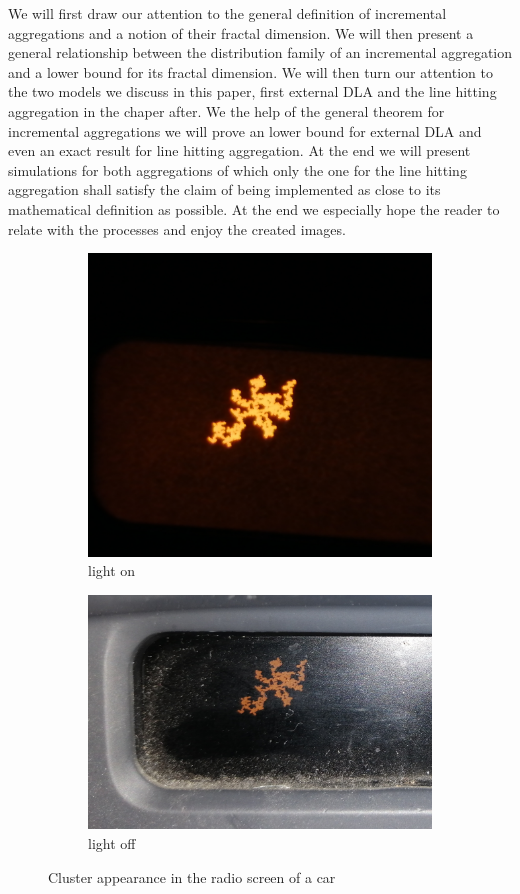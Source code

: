 \documentclass[12pt,a4paper]{scrartcl}
\numberwithin{equation}{subsection}
\newcommand{\1}{\mathbbm{1}}
\numberwithin{equation}{section}
\theoremstyle{definition}
\begin{document}
	\noindent We will first draw our attention to the general definition of incremental aggregations and a notion of their fractal dimension. We will then present a general relationship between the distribution family of an incremental aggregation and a lower bound for its fractal dimension. We will then turn our attention to the two models we discuss in this paper, first external DLA and the line hitting aggregation in the chaper after. We the help of the general theorem for incremental aggregations we will prove an lower bound for external DLA and even an exact result for line hitting aggregation. At the end we will present simulations for both aggregations of which only the one for the line hitting aggregation shall satisfy the claim of being implemented as close to its mathematical definition as possible. At the end we especially hope the reader to relate with the processes and enjoy the created images.
	
\begin{figure}[p]
	\centering
	\begin{subfigure}[b]{.47\textwidth}
		\includegraphics[width=.9\linewidth]{images/display.jpg} 
		\caption{light on} 
	\end{subfigure}
	\begin{subfigure}[b]{.47\textwidth}
		\includegraphics[width=.9\linewidth]{images/display2.jpg}
		\caption{light off} 
	\end{subfigure}
	\caption{Cluster appearance in the radio screen of a car}
	\label{radio}
\end{figure}
\end{document}
